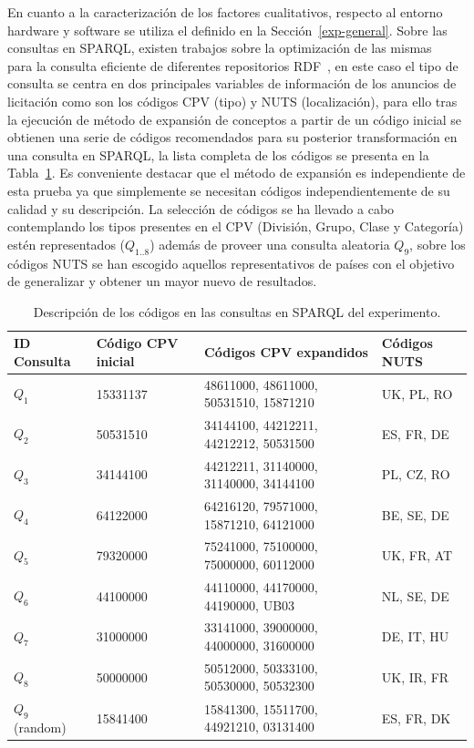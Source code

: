 \begin{enumerate}
En cuanto a la caracterización de los factores cualitativos, respecto al entorno hardware y software se utiliza el definido en la Sección~\ref{exp-general}. Sobre las consultas en SPARQL, existen trabajos sobre la optimización de las mismas~\cite{Schmidt2010,Bernstein07optarq:a,sparqlOpt} para la 
consulta eficiente de diferentes repositorios RDF~\cite{Yan:2008:EQR:1367497.1367652}, en este caso el tipo de consulta se centra en dos principales 
variables de información de los anuncios de licitación como son los códigos CPV (tipo) y NUTS (localización), para ello tras la ejecución de método 
de expansión de conceptos a partir de un código inicial se obtienen una serie de códigos recomendados para su posterior transformación en una 
consulta en SPARQL, la lista completa de los códigos se presenta en la Tabla~\ref{tabla:queries}. Es conveniente destacar que el método de expansión 
es independiente de esta prueba ya que simplemente se necesitan códigos independientemente de su calidad y su descripción. La selección de códigos se ha llevado a 
cabo contemplando los tipos presentes en el \gls{CPV} (División, Grupo, Clase y Categoría) estén representados ($Q_{1..8}$) además de proveer una consulta 
aleatoria $Q_9$, sobre los códigos \gls{NUTS} se han escogido aquellos representativos de países con el objetivo de generalizar y obtener un mayor nuevo 
de resultados.

\begin{table}[!ht]
\renewcommand{\arraystretch}{1.3}
\begin{center}
\begin{tabular}{|p{3cm}|p{2.5cm}|p{3.5cm}|p{3.5cm}|}
\hline
  \textbf{ID Consulta} & \textbf{Código CPV inicial} & \textbf{Códigos CPV expandidos} & \textbf{Códigos NUTS}  \\ \hline
  $Q_1$ & 15331137 & 48611000, 48611000, 50531510, 15871210 & UK, PL, RO \\ \hline
  $Q_2$ & 50531510 & 34144100, 44212211, 44212212, 50531500 & ES, FR, DE \\ \hline
  $Q_3$ & 34144100 & 44212211, 31140000, 31140000, 34144100 & PL, CZ, RO \\ \hline
  $Q_4$ & 64122000 & 64216120, 79571000, 15871210, 64121000 & BE, SE, DE \\ \hline
  $Q_5$ & 79320000 & 75241000, 75100000, 75000000, 60112000 & UK, FR, AT \\ \hline
  $Q_6$ & 44100000 & 44110000, 44170000, 44190000, UB03 & NL, SE, DE \\ \hline
  $Q_7$ & 31000000 & 33141000, 39000000, 44000000, 31600000 & DE, IT, HU \\ \hline
  $Q_8$ & 50000000 & 50512000, 50333100, 50530000, 50532300 & UK, IR, FR \\ \hline
  $Q_9$ (random)   & 15841400 & 15841300, 15511700, 44921210, 03131400 & ES, FR, DK \\ \hline
  \hline
  \end{tabular}
  \caption{Descripción de los códigos en las consultas en SPARQL del experimento.}
  \label{tabla:queries}
  \end{center}
\end{table} 


\end{enumerate}
